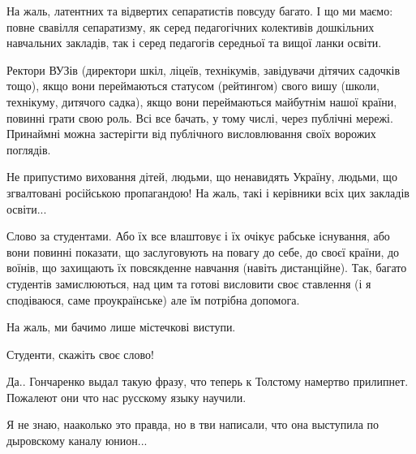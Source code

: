\begin{itemize}
На жаль, латентних та відвертих сепаратистів повсуду багато. І що ми маємо:
повне свавілля сепаратизму, як серед педагогічних колективів дошкільних
навчальних закладів, так і серед педагогів середньої та вищої ланки освіти.

Ректори ВУЗів (директори шкіл, ліцеїв, технікумів, завідувачи дітячих садочків
тощо), якщо вони переймаються статусом (рейтингом) свого вишу (школи,
технікуму, дитячого садка), якщо вони переймаються майбутнім нашої країни,
повинні грати свою роль. Всі все бачать, у тому числі, через публічні мережі.
Принаймні можна застерігти від публічного висловлювання своїх ворожих поглядів.

Не припустимо виховання дітей, людьми, що ненавидять Україну, людьми, що
згвалтовані російською пропагандою! На жаль, такі і керівники всіх цих закладів
освіти... 

Слово за студентами. Або їх все влаштовує і їх очікує рабське існування, або
вони повинні показати, що заслуговують на повагу до себе, до своєї країни, до
воїнів, що захищають їх повсякденне навчання (навіть дистанційне). Так, багато
студентів замислюються, над цим та готові висловити своє ставлення (і я
сподіваюся, саме проукраїнське) але їм потрібна допомога.

На жаль, ми бачимо лише містечкові виступи. 

Студенти, скажіть своє слово!

 
Да.. Гончаренко выдал такую фразу, что теперь к Толстому намертво прилипнет. Пожалеют они что нас русскому языку научили.

 
Я не знаю, нааколько это правда, но в тви написали, что она выступила по дыровскому каналу юнион...

 

\end{itemize}
